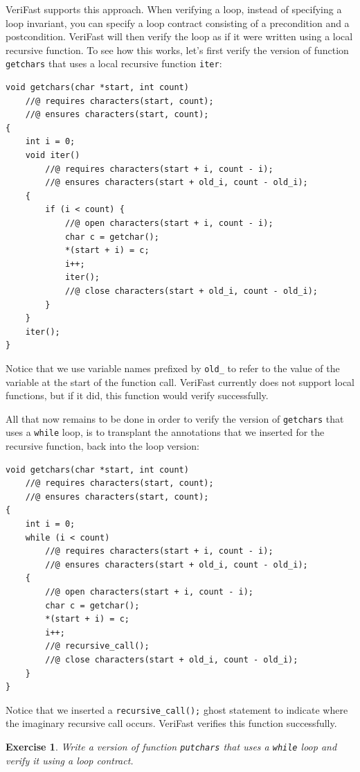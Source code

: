 \documentclass{article}
\newtheorem{exercise}{Exercise}
\begin{document}
VeriFast supports this approach. When verifying a loop, instead of specifying a loop invariant, you can specify a loop contract consisting of a
precondition and a postcondition. VeriFast will then verify the loop as if it were written using a local recursive function. To see how this works, let's
first verify the version of function \lstinline!getchars! that uses a local recursive function \lstinline!iter!:
\begin{lstlisting}
void getchars(char *start, int count)
    //@ requires characters(start, count);
    //@ ensures characters(start, count);
{
    int i = 0;
    void iter()
        //@ requires characters(start + i, count - i);
        //@ ensures characters(start + old_i, count - old_i);
    {
        if (i < count) {
            //@ open characters(start + i, count - i);
            char c = getchar();
            *(start + i) = c;
            i++;
            iter();
            //@ close characters(start + old_i, count - old_i);
        }
    }
    iter();
}
\end{lstlisting}
Notice that we use variable names prefixed by \lstinline!old_! to refer to the value of the variable at the start of the function call.
VeriFast currently does not support local functions, but if it did, this function would verify successfully.

All that now remains to be done in order to verify the version of \lstinline!getchars! that uses a \lstinline!while! loop, is to transplant the
annotations that we inserted for the recursive function, back into the loop version:
\begin{lstlisting}
void getchars(char *start, int count)
    //@ requires characters(start, count);
    //@ ensures characters(start, count);
{
    int i = 0;
    while (i < count)
        //@ requires characters(start + i, count - i);
        //@ ensures characters(start + old_i, count - old_i);
    {
        //@ open characters(start + i, count - i);
        char c = getchar();
        *(start + i) = c;
        i++;
        //@ recursive_call();
        //@ close characters(start + old_i, count - old_i);
    }
}
\end{lstlisting}
Notice that we inserted a \lstinline!recursive_call();! ghost statement to indicate where the imaginary recursive call occurs. VeriFast verifies
this function successfully.

\begin{exercise}\label{exercise:tuerk}
Write a version of function \lstinline!putchars! that uses a \lstinline!while! loop and verify it using a loop contract.
\end{exercise}
\end{document}
